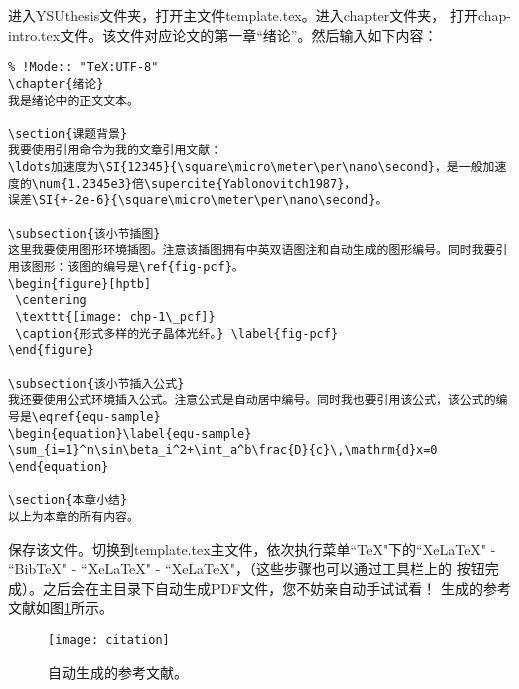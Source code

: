 进入YSUthesis文件夹，打开主文件template.tex。进入chapter文件夹，
打开chap-intro.tex文件。该文件对应论文的第一章“绪论”。然后输入如下内容：
\begin{verbatim}
% !Mode:: "TeX:UTF-8"
\chapter{绪论}
我是绪论中的正文文本。

\section{课题背景}
我要使用引用命令为我的文章引用文献：
\ldots加速度为\SI{12345}{\square\micro\meter\per\nano\second}，是一般加速度的\num{1.2345e3}倍\supercite{Yablonovitch1987}，
误差\SI{+-2e-6}{\square\micro\meter\per\nano\second}。

\subsection{该小节插图}
这里我要使用图形环境插图。注意该插图拥有中英双语图注和自动生成的图形编号。同时我要引用该图形：该图的编号是\ref{fig-pcf}。
\begin{figure}[hptb]
 \centering
 \texttt{[image: chp-1\_pcf]}
 \caption{形式多样的光子晶体光纤。} \label{fig-pcf}
\end{figure}

\subsection{该小节插入公式}
我还要使用公式环境插入公式。注意公式是自动居中编号。同时我也要引用该公式，该公式的编号是\eqref{equ-sample}
\begin{equation}\label{equ-sample}
\sum_{i=1}^n\sin\beta_i^2+\int_a^b\frac{D}{c}\,\mathrm{d}x=0
\end{equation}

\section{本章小结}
以上为本章的所有内容。
\end{verbatim}
保存该文件。切换到template.tex主文件，依次执行菜单``TeX"下的``XeLaTeX" - ``BibTeX" - ``XeLaTeX" - ``XeLaTeX"，（这些步骤也可以通过工具栏上的
按钮完成）。之后会在主目录下自动生成PDF文件，您不妨亲自动手试试看！
生成的参考文献如图\ref{fig-ctt}所示。
\begin{figure}[hptb]
 \centering
 \texttt{[image: citation]}
\caption{自动生成的参考文献。}\label{fig-ctt}
\end{figure} 